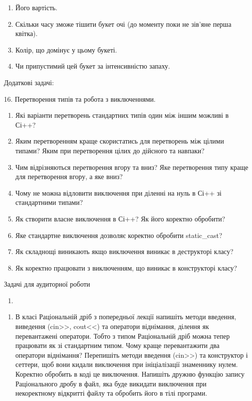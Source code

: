 \documentclass[]{article}
\begin{document}
\begin{enumerate}
\def\labelenumi{\arabic{enumi}.}
\item
  Його вартість.
\item
  Скільки часу зможе тішити букет очі (до моменту поки не зів'яне перша
  квітка).
\item
  Колір, що домінує у цьому букеті.
\item
  Чи припустимий цей букет за інтенсивністю запаху.
\end{enumerate}

Додаткові задачі:

16. Перетворення типів та робота з виключеннями.

\begin{enumerate}
\def\labelenumi{\arabic{enumi})}
\item
  Які варіанти перетворень стандартних типів один між іншим можливі в
  Сі++?
\item
  Яким перетворенням краще скористатись для перетворень між цілими
  типами? Яким при перетворення цілих до дійсного та навпаки?
\item
  Чим відрізняються перетворення вгору та вниз? Яке перетворення типу
  краще для перетворення вгору, а яке вниз?
\item
  Чому не можна відловити виключення при діленні на нуль в Сі++ зі
  стандартними типами?
\item
  Як створити власне виключення в Сі++? Як його коректно обробити?
\item
  Яке стандартне виключення дозволяє коректно обробити static\_cast?
\item
  Як складнощі виникають якщо виключення виникає в деструкторі класу?
\item
  Як коректно працювати з виключенням, що виникає в конструкторі класу?
\end{enumerate}

Задачі для аудиторної роботи

\begin{enumerate}
\def\labelenumi{\arabic{enumi})}
\item
\end{enumerate}

\begin{enumerate}
\def\labelenumi{\arabic{enumi})}
\item
  В класі Раціональній дріб з попередньої лекції напишіть методи
  введення, виведення (cin\textgreater{}\textgreater{},
  cout\textless{}\textless{}) та оператори віднімання, ділення як
  перевантажені оператори. Тобто з типом Раціональній дріб можна тепер
  працювати як зі стандартним типом. Чому краще перевантажити два
  оператори віднімання? Перепишіть методи введення
  (cin\textgreater{}\textgreater{}) та конструктор і сеттери, щоб вони
  кидали виключення при ініціалізації знаменнику нулем. Коректно
  обробить в коді це виключення. Напишіть дружню функцію запису
  Раціонального дробу в файл, яка буде викидати виключення при
  некоректному відкритті файлу та обробить його в тілі програми.
\end{enumerate}
\end{document}
